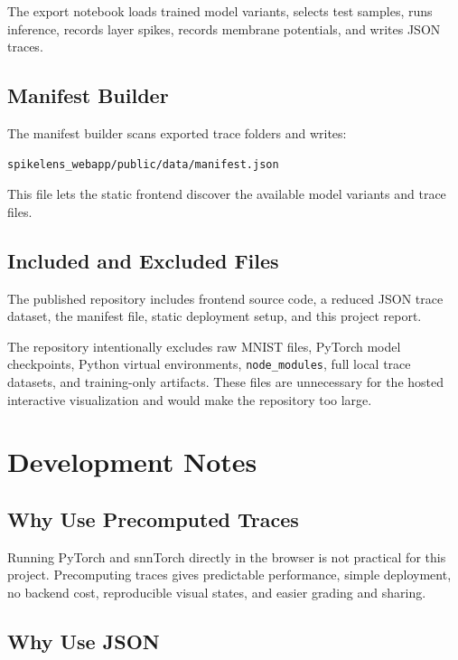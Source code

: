 \documentclass[11pt,a4paper]{article}
\begin{document}
The export notebook loads trained model variants, selects test samples, runs inference, records layer spikes, records membrane potentials, and writes JSON traces.

\subsection{Manifest Builder}

The manifest builder scans exported trace folders and writes:

\begin{lstlisting}
spikelens_webapp/public/data/manifest.json
\end{lstlisting}

This file lets the static frontend discover the available model variants and trace files.

\subsection{Included and Excluded Files}

The published repository includes frontend source code, a reduced JSON trace dataset, the manifest file, static deployment setup, and this project report.

The repository intentionally excludes raw MNIST files, PyTorch model checkpoints, Python virtual environments, \texttt{node\_modules}, full local trace datasets, and training-only artifacts. These files are unnecessary for the hosted interactive visualization and would make the repository too large.

\section{Development Notes}

\subsection{Why Use Precomputed Traces}

Running PyTorch and snnTorch directly in the browser is not practical for this project. Precomputing traces gives predictable performance, simple deployment, no backend cost, reproducible visual states, and easier grading and sharing.

\subsection{Why Use JSON}
\end{document}
